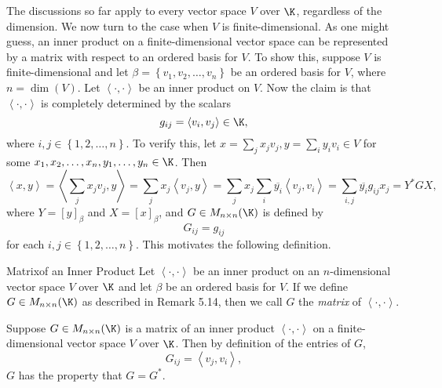 \documentclass[linearalgebraII]{subfiles}
\begin{document}
    \begin{remark}
        The discussions so far apply to every vector space $V$ over $\K$, regardless of the dimension. We now turn to the case when $V$ is finite-dimensional. As one might guess, an inner product on a finite-dimensional vector space can be represented by a matrix with respect to an ordered basis for $V$. To show this, suppose $V$ is finite-dimensional and let $\beta = \left\lbrace v_1,v_2,\ldots,v_n \right\rbrace$ be an ordered basis for $V$, where $n=\dim(V)$. Let $\left\langle \cdot, \cdot\right\rangle$ be an inner product on $V$. Now the claim is that $\left\langle \cdot, \cdot\right\rangle$ is completely determined by the scalars
        \begin{equation*}
            g_{ij} = \left\langle v_i, v_j\right\rangle \in\K,
        \end{equation*}
        where $i,j\in\left\lbrace 1,2,\ldots,n \right\rbrace$. To verify this, let $x=\sum^{}_{j} x_jv_j, y=\sum^{}_{i} y_iv_i\in V$ for some $x_1,x_2,\ldots,x_n,y_1,\ldots,y_n\in\K$. Then
        \begin{equation*}
            \left\langle x, y\right\rangle = \left\langle \sum^{}_{j} x_jv_j, y \right\rangle = \sum^{}_{j} x_j\left\langle v_j, y\right\rangle = \sum^{}_{j} x_j \sum^{}_{i} \overline{y_i} \left\langle v_j, v_i\right\rangle = \sum^{}_{i,j} \overline{y_i}g_{ij}x_{j} = Y^*GX,
        \end{equation*}
        where $Y = \left[ y \right] _\beta$ and $X=\left[ x \right] _\beta$, and $G\in M_{n\times n}(\K)$ is defined by
        \begin{equation*}
            G_{ij} = g_{ij}
        \end{equation*}
        for each $i,j\in\left\lbrace 1,2,\ldots,n \right\rbrace$. This motivates the following definition.
    \end{remark}

    \begin{definition}{Matrix}{of an Inner Product}
        Let $\left\langle \cdot, \cdot\right\rangle $ be an inner product on an $n$-dimensional vector space $V$ over $\K$ and let $\beta$ be an ordered basis for $V$. If we define $G\in M_{n\times n}(\K)$ as described in Remark 5.14, then we call $G$ the \emph{matrix} of $\left\langle \cdot, \cdot\right\rangle$.
    \end{definition}

    \begin{remark}
        Suppose $G\in M_{n\times n}(\K)$ is a matrix of an inner product $\left\langle \cdot, \cdot\right\rangle$ on a finite-dimensional vector space $V$ over $\K$. Then by definition of the entries of $G$,
        \begin{equation*}
            G_{ij} = \left\langle v_j, v_i\right\rangle ,
        \end{equation*}
        $G$ has the property that $G=G^*$.
    \end{remark}
\end{document}
